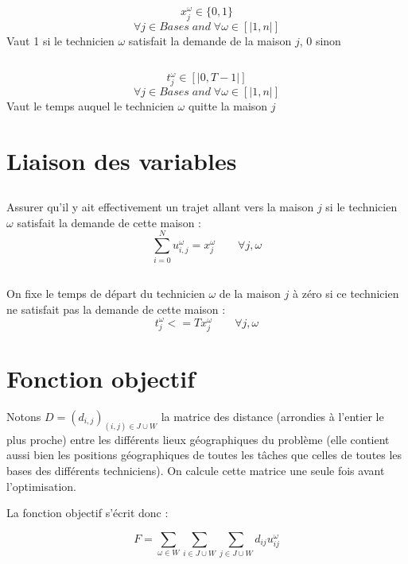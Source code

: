 \documentclass[a4paper, 11pt]{article} %
\begin{document}
\subsection{}
$$x_j^{\omega} \in \{0,1\} $$
$$ \forall j \in Bases \; and \; \forall \omega \in [|1,n|] $$
Vaut 1 si le technicien $\omega$ satisfait la demande de la maison $j$, 0 sinon

\subsection{}
$$ t_j^{\omega} \in [|0,T-1|] $$ 
$$ \forall j \in Bases \; and \; \forall \omega \in [|1,n|] $$
Vaut le temps auquel le technicien $\omega$ quitte la maison $j$

\section{Liaison des variables}
\subsection{}
Assurer qu'il y ait effectivement un trajet allant vers la maison $j$ si le technicien $\omega$ satisfait la demande de cette maison :
$$ \sum_{i=0}^{N} u_{i,j}^{\omega} = x_j^{\omega}  \qquad \forall j,\omega $$

\subsection{}
On fixe le temps de départ du technicien $\omega$ de la maison $j$ à zéro si ce technicien ne satisfait pas la demande de cette maison :
$$ t_j^{\omega} <= T x_j^{\omega} \qquad \forall j,\omega $$

\section{Fonction objectif}
Notons $D = (d_{i,j})_{(i,j) \in J \cup W}$ la matrice des distance (arrondies à l'entier le plus proche) entre les différents lieux géographiques du problème (elle contient aussi bien les positions géographiques de toutes les tâches que celles de toutes les bases des différents techniciens). On calcule cette matrice une seule fois avant l'optimisation.

La fonction objectif s'écrit donc :

\[ F = \sum_{\omega \in W} \sum_{ i \in J \cup W} \sum_{ j \in J \cup W} d_{ij} u_{ij}^{\omega} \]
\end{document}

